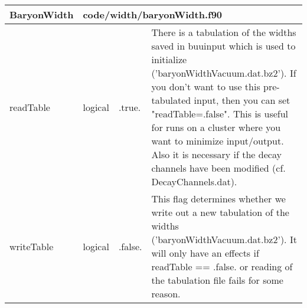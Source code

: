 \documentclass{article}
\begin{document}
\begin{longtable}{llll}
\toprule
\textbf{\large{BaryonWidth}} & \multicolumn{3}{l}{\footnotesize{code/width/baryonWidth.f90}}\\*
\midrule
\endfirsthead
\midrule
\endhead
readTable & \begin{minipage}[t]{2cm}logical\end{minipage} & \begin{minipage}[t]{2cm}.true.\end{minipage} & \begin{minipage}[t]{12cm}There is a tabulation of the widths saved in buuinput which is used to initialize ('baryonWidthVacuum.dat.bz2'). If you don't want to use this pre-tabulated input, then you can set "readTable=.false". This is useful for runs on a cluster where you want to minimize input/output. Also it is necessary if the decay channels have been modified (cf. DecayChannels.dat).\end{minipage}\\*
\midrule
writeTable & \begin{minipage}[t]{2cm}logical\end{minipage} & \begin{minipage}[t]{2cm}.false.\end{minipage} & \begin{minipage}[t]{12cm}This flag determines whether we write out a new tabulation of the widths ('baryonWidthVacuum.dat.bz2'). It will only have an effects if readTable == .false. or reading of the tabulation file fails for some reason.\end{minipage}\\*
\bottomrule
\end{longtable}
{ }



\end{document}
